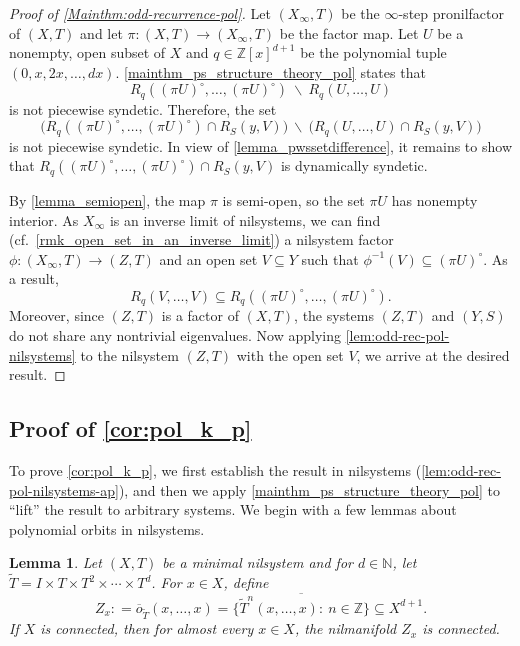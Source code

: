 \documentclass{article}
\theoremstyle{plain}
\newtheorem{lemma}[Theorem]{Lemma}
\theoremstyle{claim}
\theoremstyle{definition}
\theoremstyle{plain}
\theoremstyle{plain}
\newcommand{\N}{\mathbb{N}}
\newcommand{\Z}{\mathbb{Z}}
\renewcommand{\setminus}{\backslash}
\newcommand{\1}{\boldsymbol{1}}
\begin{document}
\begin{proof}[Proof of \cref{Mainthm:odd-recurrence-pol}]



Let $(X_{\infty}, T)$ be the $\infty$-step pronilfactor of $(X, T)$ and let $\pi: (X, T) \to (X_{\infty}, T)$ be the factor map. Let $U$ be a nonempty, open subset of $X$ and $q \in \Z[x]^{d+1}$ be the polynomial tuple $(0,x, 2x, \ldots, dx)$. \cref{mainthm_ps_structure_theory_pol} states that
\[
    R_q((\pi U)^{\circ}, \ldots, (\pi U)^{\circ}) \ \setminus \ R_q(U, \ldots, U) 
\]
is not piecewise syndetic. Therefore, the set
\[
    \big( R_q((\pi U)^{\circ}, \ldots, (\pi U)^{\circ}) \cap R_S(y, V) \big) \ \setminus  \ \big(R_q(U, \ldots, U) \cap R_S(y, V) \big)
\]
is not piecewise syndetic.
In view of \cref{lemma_pwssetdifference}, it remains to show that $R_q((\pi U)^{\circ}, \ldots, (\pi U)^{\circ}) \cap R_S(y, V)$ is dynamically syndetic. 


By \cref{lemma_semiopen}, the map $\pi$ is semi-open, so the set $\pi U$ has nonempty interior.
As $X_\infty$ is an inverse limit of nilsystems, we can find (cf.\ \cref{rmk_open_set_in_an_inverse_limit}) a nilsystem factor $\phi : (X_\infty, T) \to (Z, T)$ and an open set $V \subseteq Y$ such that $\phi^{-1}(V) \subseteq (\pi U)^\circ$.
As a result,
\[
    R_q(V, \ldots, V) \subseteq R_q((\pi U)^{\circ}, \ldots, (\pi U)^{\circ}).
\]
Moreover, since $(Z, T)$ is a factor of $(X, T)$, the systems $(Z, T)$ and $(Y,S)$ do not share any nontrivial eigenvalues.
Now applying \cref{lem:odd-rec-pol-nilsystems} to the nilsystem $(Z, T)$ with the open set $V$, we arrive at the desired result.
\end{proof}



\subsection{Proof of \texorpdfstring{\cref{cor:pol_k_p}}{Theorem C}}
\label{sec_proof_of_theorem_b}

To prove \cref{cor:pol_k_p}, we first establish the result in nilsystems (\cref{lem:odd-rec-pol-nilsystems-ap}), and then we apply \cref{mainthm_ps_structure_theory_pol} to ``lift'' the result to arbitrary systems.
We begin with a few lemmas about polynomial orbits in nilsystems.

\begin{lemma}\label{lem:same-mef3}
    Let $(X, T)$ be a minimal nilsystem and for $d \in \N$, let $\tilde{T} = I \times T \times T^2 \times \cdots \times T^d$.
For $x \in X$, define
\[
    Z_x : = \overline{o}_{\tilde{T}}(x,\ldots,x) = \overline{\big\{\tilde{T}^n(x, \ldots, x): \ n \in \Z\big\}} \subseteq X^{d+1}.
\]
If $X$ is connected, then for almost every $x\in X$, the nilmanifold $Z_x$ is connected.
\end{lemma}
\end{document}
